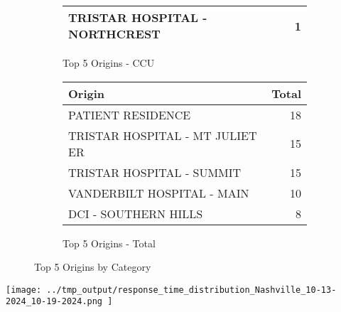 \documentclass{article}
\begin{document}
\begin{figure}[htbp]
\begin{subfigure}[b]{0.45\textwidth}
\begin{tabular}{|l|r|}
                TRISTAR HOSPITAL - NORTHCREST & 1 \\
            
            \hline
        \end{tabular}
        \caption{Top 5 Origins - CCU}
    \end{subfigure}
    \hfill
    \begin{subfigure}[b]{0.45\textwidth}
        \centering
        \begin{tabular}{|l|r|}
            \hline
            Origin & Total \\
            \hline
            
                PATIENT RESIDENCE & 18 \\
            
                TRISTAR HOSPITAL - MT JULIET ER & 15 \\
            
                TRISTAR HOSPITAL - SUMMIT & 15 \\
            
                VANDERBILT HOSPITAL - MAIN & 10 \\
            
                DCI - SOUTHERN HILLS & 8 \\
            
            \hline
        \end{tabular}
        \caption{Top 5 Origins - Total}
    \end{subfigure}
    \caption{Top 5 Origins by Category}
\end{figure}

\texttt{[image:  ../tmp\_output/response\_time\_distribution\_Nashville\_10-13-2024\_10-19-2024.png ]}

\clearpage



\clearpage
\end{document}
